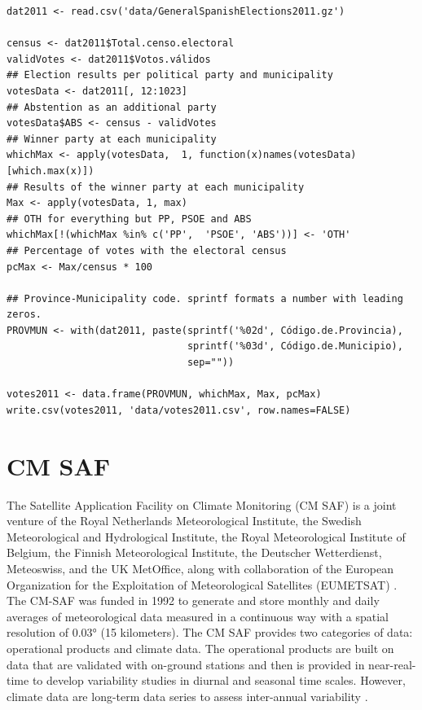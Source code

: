 \documentclass[smallroyalvopaper]{memoir}
\begin{document}

\lstset{language=R,numbers=none}
\begin{lstlisting}
dat2011 <- read.csv('data/GeneralSpanishElections2011.gz')

census <- dat2011$Total.censo.electoral
validVotes <- dat2011$Votos.válidos
## Election results per political party and municipality
votesData <- dat2011[, 12:1023]
## Abstention as an additional party
votesData$ABS <- census - validVotes
## Winner party at each municipality
whichMax <- apply(votesData,  1, function(x)names(votesData)[which.max(x)])
## Results of the winner party at each municipality
Max <- apply(votesData, 1, max)
## OTH for everything but PP, PSOE and ABS
whichMax[!(whichMax %in% c('PP',  'PSOE', 'ABS'))] <- 'OTH'
## Percentage of votes with the electoral census
pcMax <- Max/census * 100

## Province-Municipality code. sprintf formats a number with leading zeros.
PROVMUN <- with(dat2011, paste(sprintf('%02d', Código.de.Provincia),
                               sprintf('%03d', Código.de.Municipio),
                               sep=""))

votes2011 <- data.frame(PROVMUN, whichMax, Max, pcMax)
write.csv(votes2011, 'data/votes2011.csv', row.names=FALSE)
\end{lstlisting}

\section{CM SAF}
\label{sec-3}
\label{sec:CMSAF}

The Satellite Application Facility on Climate Monitoring (CM SAF) is a
joint venture of the Royal Netherlands Meteorological Institute, the
Swedish Meteorological and Hydrological Institute, the Royal
Meteorological Institute of Belgium, the Finnish Meteorological
Institute, the Deutscher Wetterdienst, Meteoswiss, and the UK
MetOffice, along with collaboration of the European Organization for
the Exploitation of Meteorological Satellites (EUMETSAT)
\cite{CMSAF}. The CM-SAF was funded in 1992 to generate and store
monthly and daily averages of meteorological data measured in a
continuous way with a spatial resolution of $\ang{0.03}$ (15
kilometers). The CM SAF provides two categories of data: operational
products and climate data. The operational products are built on data
that are validated with on-ground stations and then is provided in
near-real-time to develop variability studies in diurnal and seasonal
time scales. However, climate data are long-term data series to assess
inter-annual variability \cite{Posselt.Mueller.ea2012}.
\end{document}
